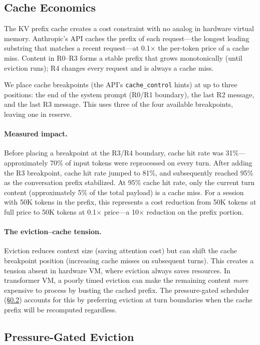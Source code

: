 \documentclass[sigplan,screen,anonymous]{acmart}
\begin{document}
\subsection{Cache Economics}
\label{sec:cache}

The KV prefix cache creates a cost constraint with no analog in
hardware virtual memory. Anthropic's API caches the prefix of each
request---the longest leading substring that matches a recent
request---at 0.1$\times$ the per-token price of a cache miss. Content
in R0--R3 forms a stable prefix that grows monotonically (until
eviction runs); R4 changes every request and is always a cache miss.

We place cache breakpoints (the API's \texttt{cache\_control} hints)
at up to three positions: the end of the system prompt (R0/R1
boundary), the last R2 message, and the last R3 message. This uses
three of the four available breakpoints, leaving one in reserve.

\paragraph{Measured impact.} Before placing a breakpoint at the R3/R4
boundary, cache hit rate was 31\%---approximately 70\% of input tokens
were reprocessed on every turn. After adding the R3 breakpoint, cache
hit rate jumped to 81\%, and subsequently reached 95\% as the
conversation prefix stabilized. At 95\% cache hit rate, only the
current turn content (approximately 5\% of the total payload) is a
cache miss. For a session with 50K tokens in the prefix, this
represents a cost reduction from 50K tokens at full price to 50K
tokens at 0.1$\times$ price---a 10$\times$ reduction on the prefix
portion.

\paragraph{The eviction--cache tension.} Eviction reduces context size
(saving attention cost) but can shift the cache breakpoint position
(increasing cache misses on subsequent turns). This creates a tension
absent in hardware VM, where eviction always saves resources. In
transformer VM, a poorly timed eviction can make the remaining content
\emph{more} expensive to process by busting the cached prefix. The
pressure-gated scheduler (\S\ref{sec:pressure}) accounts for this by
preferring eviction at turn boundaries when the cache prefix will be
recomputed regardless.

\subsection{Pressure-Gated Eviction}
\label{sec:pressure}
\end{document}
